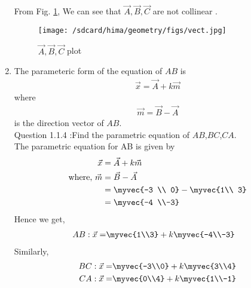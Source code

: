 \documentclass[11pt]{book}
\begin{document}
\begin{enumerate}[label=\thesection.\arabic*.,ref=\thesection.\theenumi]
From Fig. \ref{fig1:Triangle}, We can see that $\vec{A},\vec{B},\vec{C}$ are not collinear .
\begin{figure}[H]
\centering
\texttt{[image: /sdcard/hima/geometry/figs/vect.jpg]}
\caption{$\vec{A},\vec{B},\vec{C}$ plot}
\label{fig1:Triangle}
\end{figure}



\item The parameteric form of the equation  of $AB$ is 
		\begin{align}
			\vec{x}=\vec{A}+k\vec{m}
		\end{align}
		where
		\begin{align}
\vec{m}=\vec{B}-\vec{A}
		\end{align}
is the direction vector of $AB$.\\
Question 1.1.4 :Find the parametric equation of $AB$,$BC$,$CA$.\\
\solution
The parametric equation for AB is given by
\begin{align}
\vec{x} &= \vec{A} + k\vec{m}\\
\text{where, } \vec{m} &= \vec{B} -\vec{A}\\
&= \myvec{-3 \\ 0} -\myvec{1\\ 3}\\
&= \myvec{-4 \\-3}
\end{align}
Hence we get,
\begin{align}
AB: \vec{x} = &\myvec{1\\3} + k \myvec{-4\\-3}
\end{align}
Similarly, 
\begin{align}
BC: \vec{x} = &\myvec{-3\\0} + k \myvec{3\\4}\\
CA: \vec{x} = &\myvec{0\\4} + k \myvec{1\\-1}
\end{align}



\end{enumerate}
\end{document}
